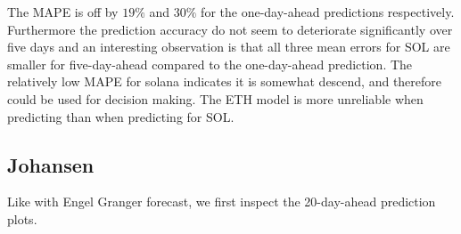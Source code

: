 \noindent  
The MAPE is off by $19\%$ and $30\%$ for the one-day-ahead predictions respectively. Furthermore the prediction accuracy do not seem to deteriorate significantly over five days and an interesting observation is that all three mean errors for SOL are smaller for five-day-ahead compared to the one-day-ahead prediction. The relatively low MAPE for solana indicates it is somewhat descend, and therefore could be used for decision making. The ETH model is more unreliable when predicting than when predicting for SOL.
\pause

\subsection{Johansen}
Like with Engel Granger forecast, we first inspect the 20-day-ahead prediction plots. 

